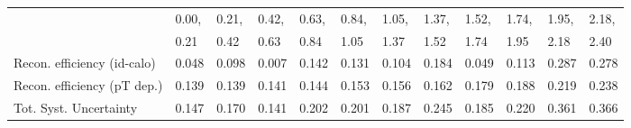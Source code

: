 \begin{tabular}{l|p{0.6cm}p{0.6cm}p{0.6cm}p{0.6cm}p{0.6cm}p{0.6cm}p{0.6cm}p{0.6cm}p{0.6cm}p{0.6cm}p{0.6cm}}
\hline
   & 0.00, & 0.21, & 0.42, & 0.63, & 0.84, & 1.05, & 1.37, & 1.52, & 1.74, & 1.95, & 2.18,  \\ 
   & 0.21 & 0.42 & 0.63 & 0.84 & 1.05 & 1.37 & 1.52 & 1.74 & 1.95 & 2.18 & 2.40  \\ 
\hline
Recon. efficiency (id-calo)              & 0.048 & 0.098 & 0.007 & 0.142 & 0.131 & 0.104 & 0.184 & 0.049 & 0.113 & 0.287 & 0.278 \\
\hline
Recon. efficiency (pT dep.)              & 0.139 & 0.139 & 0.141 & 0.144 & 0.153 & 0.156 & 0.162 & 0.179 & 0.188 & 0.219 & 0.238 \\
\hline
Tot. Syst. Uncertainty                   & 0.147 & 0.170 & 0.141 & 0.202 & 0.201 & 0.187 & 0.245 & 0.185 & 0.220 & 0.361 & 0.366 \\
\hline
\end{tabular}
